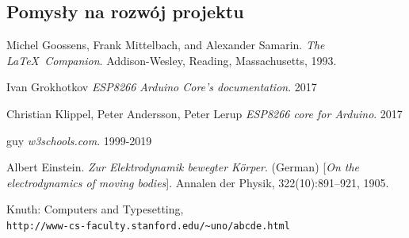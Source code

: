 \documentclass[12pt]{article}
\begin{document}
\subsection{Pomysły na rozwój projektu }
\begin{thebibliography}{9}


Michel Goossens, Frank Mittelbach, and Alexander Samarin. 
\textit{The \LaTeX\ Companion}. 
Addison-Wesley, Reading, Massachusetts, 1993.

Ivan Grokhotkov
\textit{ESP8266 Arduino Core’s documentation}. 
2017

Christian Klippel, Peter Andersson, Peter Lerup
\textit{ESP8266 core for Arduino}. 
2017

guy
\textit{w3schools.com}. 
1999-2019
 
Albert Einstein. 
\textit{Zur Elektrodynamik bewegter K{\"o}rper}. (German) 
[\textit{On the electrodynamics of moving bodies}]. 
Annalen der Physik, 322(10):891–921, 1905.
 
Knuth: Computers and Typesetting,
\\\texttt{http://www-cs-faculty.stanford.edu/\~{}uno/abcde.html}
\end{thebibliography}
\end{document}
